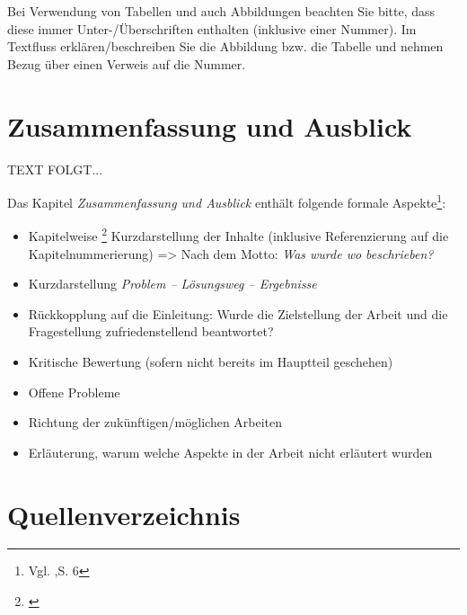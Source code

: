 \documentclass[a4paper,12pt,oneside]{article}
\begin{document}
    Bei Verwendung von Tabellen und auch Abbildungen beachten Sie bitte, dass diese immer Unter-/Überschriften enthalten (inklusive einer Nummer). Im Textfluss erklären/beschreiben Sie die Abbildung bzw. die Tabelle und nehmen Bezug über einen Verweis auf die Nummer.
  
  
  \newpage 
  \section{Zusammenfassung und Ausblick}\label{kap_zusammfAusbl}  
   TEXT FOLGT...
   
    \vspace{1cm}
 \begin{tcolorbox}[title={Inhalte der \textit{Zusammenfassung und Ausblick}}]
Das Kapitel \textit{Zusammenfassung und Ausblick} enthält folgende formale Aspekte\footnote{Vgl. \cite{BBoJ},S. 6}:
\begin{itemize}
\item Kapitelweise \footnote{ \cite{einstein} } Kurzdarstellung der Inhalte (inklusive Referenzierung auf die Kapitelnummerierung) => Nach dem Motto: \textit{Was wurde wo beschrieben?}
\item Kurzdarstellung \textit{Problem – Lösungsweg – Ergebnisse}
\item Rückkopplung auf die Einleitung: Wurde die Zielstellung der Arbeit und die Fragestellung zufriedenstellend beantwortet?
\item Kritische Bewertung (sofern nicht bereits im Hauptteil geschehen)
\item Offene Probleme
\item Richtung der zukünftigen/möglichen Arbeiten
\item Erläuterung, warum welche Aspekte in der Arbeit nicht erläutert wurden
\end{itemize}
  \end{tcolorbox}
   
   \newpage
    \pagestyle{empty}
   \section{Quellenverzeichnis}
  
  \printbibliography %
   
\end{document}
